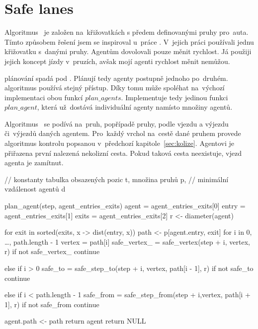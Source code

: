 \section{Safe lanes}\label{sec:safe_lanes}



Algoritmus~ je založen na~křižovatkách s předem definovanými pruhy pro~auta.
Tímto způsobem řešení jsem se inspiroval u~práce \citet{Dresner}.
V~jejich práci používali jednu křižovatku s~danými pruhy.
Agentům dovolovali pouze měnit rychlost.
Já použiji jejich koncept jízdy v~pruzích, avšak mojí agenti rychlost měnit nemůžou.

\citet{Dresner} plánování spadá pod .
Plánují tedy agenty postupně jednoho po~druhém.
 algoritmus používá stejný přístup.
Díky tomu může spoléhat na~výchozí implementaci obou funkcí $plan\_agents$.
Implementuje tedy jedinou funkci $plan\_agent$, která už~dostává individuální agenty namísto množiny agentů.

Algoritmus~ se podívá na~pruh, popřípadě pruhy, podle vjezdu a výjezdu či~výjezdů daných agentem.
Pro~každý vrchol na~cestě dané pruhem provede algoritmus kontrolu popsanou v~předchozí kapitole~\ref{sec:kolize}.
Agentovi je přiřazena první nalezená nekolizní cesta.
Pokud taková cesta neexistuje, vjezd agenta je zamítnut.

\begin{code}
// konstanty tabulka obsazených pozic t, množina pruhů p,
// minimální vzdálenost agentů d

plan_agent(step, agent_entries_exits)
  agent = agent_entries_exits[0]
  entry = agent_entries_exits[1]
  exits = agent_entries_exits[2]
  r <- diameter(agent)

  for exit in sorted(exits, x -> dist(entry, x))
    path <- p[agent.entry, exit]
    for i in 0, \ldots, path.length - 1
      vertex = path[i]
      safe_vertex_ = safe_vertex(step + i, vertex, r)
      if not safe_vertex_
        continue

      else if i > 0
        safe_to = safe_step_to(step + i, vertex, path[i - 1], r)
        if not safe_to
          continue

      else if i < path.length - 1
        safe_from = safe_step_from(step + i,vertex, path[i + 1], r)
        if not safe_from
          continue

    agent.path <- path
    return agent
  return NULL
\end{code}
